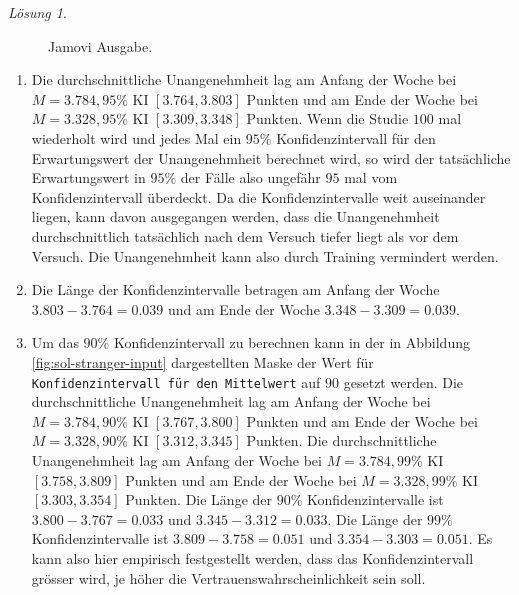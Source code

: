 \documentclass[
]{book}
\providecommand{\tightlist}{%
  \setlength{\itemsep}{0pt}\setlength{\parskip}{0pt}}
\theoremstyle{definition}
\theoremstyle{definition}
\theoremstyle{definition}
\theoremstyle{definition}
\theoremstyle{remark}
\newtheorem*{solution}{Lösung}
\begin{document}
\begin{solution}
\begin{figure}
{}

\caption{Jamovi Ausgabe.}\label{fig:sol-stranger-output}
\end{figure}

\begin{enumerate}
\def\labelenumi{(\alph{enumi})}
\tightlist
\item
  Die durchschnittliche Unangenehmheit lag am Anfang der Woche bei \(M=3.784, 95\%\) KI \([3.764, 3.803]\) Punkten und am Ende der Woche bei \(M=3.328, 95\%\) KI \([3.309, 3.348]\) Punkten. Wenn die Studie \(100\) mal wiederholt wird und jedes Mal ein \(95\%\) Konfidenzintervall für den Erwartungswert der Unangenehmheit berechnet wird, so wird der tatsächliche Erwartungswert in \(95\%\) der Fälle also ungefähr \(95\) mal vom Konfidenzintervall überdeckt. Da die Konfidenzintervalle weit auseinander liegen, kann davon ausgegangen werden, dass die Unangenehmheit durchschnittlich tatsächlich nach dem Versuch tiefer liegt als vor dem Versuch. Die Unangenehmheit kann also durch Training vermindert werden.
\item
  Die Länge der Konfidenzintervalle betragen am Anfang der Woche \(3.803-3.764=0.039\) und am Ende der Woche \(3.348-3.309= 0.039\).
\item
  Um das \(90\%\) Konfidenzintervall zu berechnen kann in der in Abbildung \ref{fig:sol-stranger-input} dargestellten Maske der Wert für \texttt{Konfidenzintervall\ für\ den\ Mittelwert} auf \(90\) gesetzt werden. Die durchschnittliche Unangenehmheit lag am Anfang der Woche bei \(M=3.784, 90\%\) KI \([3.767, 3.800]\) Punkten und am Ende der Woche bei \(M=3.328, 90\%\) KI \([3.312, 3.345]\) Punkten. Die durchschnittliche Unangenehmheit lag am Anfang der Woche bei \(M=3.784, 99\%\) KI \([3.758, 3.809]\) Punkten und am Ende der Woche bei \(M=3.328, 99\%\) KI \([3.303, 3.354]\) Punkten. Die Länge der \(90\%\) Konfidenzintervalle ist \(3.800-3.767=0.033\) und \(3.345-3.312=0.033\). Die Länge der \(99\%\) Konfidenzintervalle ist \(3.809-3.758=0.051\) und \(3.354-3.303=0.051\). Es kann also hier empirisch festgestellt werden, dass das Konfidenzintervall grösser wird, je höher die Vertrauenswahrscheinlichkeit sein soll.
\end{enumerate}

\end{solution}
\end{document}
